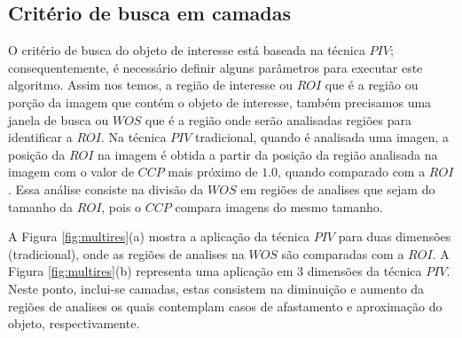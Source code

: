 \subsection{Critério de busca em camadas}

O critério de busca do objeto de interesse está baseada na técnica $PIV$; 
consequentemente, é necessário definir alguns parâmetros para executar  
este algoritmo. Assim nos temos, a região de interesse ou $ROI$ 
 que é a região ou porção da imagem que contém
o objeto de interesse, também precisamos uma janela de busca ou $WOS$
que é a região onde serão analisadas regiões para identificar a $ROI$. 
Na técnica $PIV$ tradicional, quando é analisada uma imagen, 
a posição da $ROI$ na imagem é obtida a partir 
da posição da região analisada na imagem com o valor de $CCP$ mais próximo de $1.0$,
quando comparado com a $ROI$. 
Essa análise consiste na divisão da $WOS$ em regiões de analises que sejam do tamanho da $ROI$, pois o $CCP$
compara imagens do mesmo tamanho.

A Figura \ref{fig:multires}(a) mostra a aplicação da técnica $PIV$ 
para duas dimensões (tradicional), onde as regiões de analises na $WOS$
são comparadas com a $ROI$. 
A Figura \ref{fig:multires}(b) representa uma aplicação em 3 dimensões da técnica $PIV$. 
Neste ponto, inclui-se camadas, estas consistem na diminuição e aumento da regiões de analises os quais 
contemplam casos de afastamento e aproximação do objeto, respectivamente.

